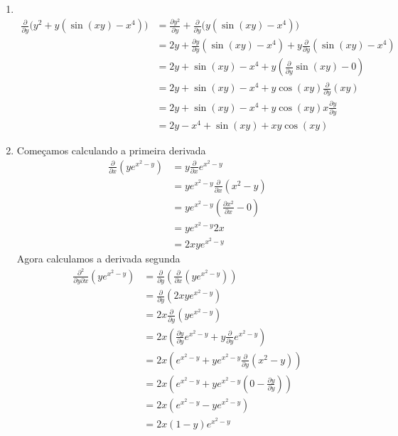 \documentclass[a4paper,12pt,fleqn]{article}
\newcommand{\D}[2]{\frac{\partial {#1}}{\partial {#2}}}
\newcommand{\DM}[3]{\frac{\partial^2 {#1}}{\partial {#2} \partial {#3}}}
\begin{document}
\begin{answer}
\begin{enumerate}
  \item[a)] ~\vspace{-2\baselineskip}
  \begin{align*}
    \D{}{y} \Big(y^2 + y\left(\sin(xy)-x^4\right)\Big)
    & = \D{y^2}{y} + \D{}{y}\Big(y\left(\sin(xy)-x^4\right)\Big) \\[2mm]
    & = 2y + \D{y}{y}\left(\sin(xy)-x^4\right) + y\D{}{y}\left(\sin(xy)-x^4\right) \\[2mm]
    & = 2y + \sin(xy) - x^4 + y\left(\D{}{y}\sin(xy)-0\right) \\[2mm]
    & = 2y + \sin(xy) - x^4 + y\cos(xy)\D{}{y}(xy) \\[2mm]
    & = 2y + \sin(xy) - x^4 + y\cos(xy)x\D{y}{y} \\[2mm]
    & = 2y  - x^4 + \sin(xy) + xy\cos(xy)
  \end{align*}
  \item[b)] Começamos calculando a primeira derivada
  \begin{align*}
    \D{}{x} \left(y e^{x^2 - y}\right)
    & = y \D{}{x} e^{x^2 - y} \\[2mm]
    & = y e^{x^2 - y} \D{}{x}\left(x^2 - y\right) \\[2mm]
    & = y e^{x^2 - y} \left(\D{x^2}{x} - 0\right) \\[2mm]
    & = y e^{x^2 - y} 2x \\[2mm]
    & = 2xy e^{x^2 - y}
  \end{align*}
  Agora calculamos a derivada segunda
  \begin{align*}
    \DM{}{y}{x} \left(y e^{x^2 - y}\right)
    & = \D{}{y}\left(\D{}{x} \left(y e^{x^2 - y}\right)\right) \\[2mm]
    & = \D{}{y}\left(2xy e^{x^2 - y}\right) \\[2mm]
    & = 2x\D{}{y}\left(y e^{x^2 - y}\right) \\[2mm]
    & = 2x\left(\D{y}{y}e^{x^2 - y} + y \D{}{y}e^{x^2 - y}\right) \\[2mm]
    & = 2x\left(e^{x^2 - y}
            + y e^{x^2 - y}\D{}{y}\left(x^2 - y\right)\right) \\[2mm]
    & = 2x\left(e^{x^2 - y}
            + y e^{x^2 - y}\left(0 - \D{y}{y}\right)\right) \\[2mm]
    & = 2x\left(e^{x^2 - y} - y e^{x^2 - y}\right) \\[2mm]
    & = 2x(1-y)e^{x^2 - y}
  \end{align*}
\end{enumerate}
\clearpage
\end{answer}

\end{document}
